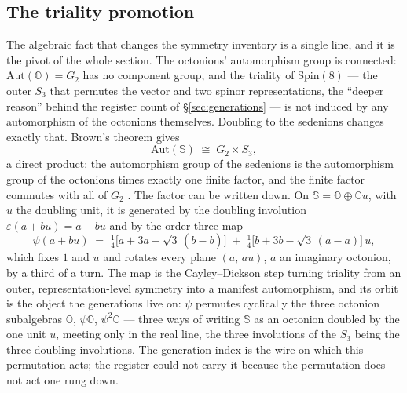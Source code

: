 \subsection{The triality promotion}
\label{sec:sedenions-promotion}

The algebraic fact that changes the symmetry inventory is a single line, and it is the pivot of the
whole section. The octonions' automorphism group is connected: $\mathrm{Aut}(\mathbb{O}) = G_2$ has
no component group, and the triality of $\mathrm{Spin}(8)$ --- the outer $S_3$ that permutes the
vector and two spinor representations, the ``deeper reason'' behind the register count of
\S\ref{sec:generations} --- is not induced by any automorphism of the octonions themselves. Doubling
to the sedenions changes exactly that. Brown's theorem gives
\begin{equation}
  \mathrm{Aut}(\mathbb{S}) \;\cong\; G_2 \times S_3,
  \label{eq:brown}
\end{equation}
a direct product: the automorphism group of the sedenions is the automorphism group of the
octonions times exactly one finite factor, and the finite factor commutes with all of $G_2$
\autocite{brown1967generalized}. The factor can be written down. On
$\mathbb{S} = \mathbb{O}\oplus\mathbb{O}u$, with $u$ the doubling unit, it is generated by the
doubling involution $\varepsilon(a + bu) = a - bu$ and by the order-three map
\begin{equation}
  \psi(a + bu) \;=\; \tfrac14\bigl[a + 3\bar a + \sqrt3\,(b - \bar b)\bigr]
              \;+\; \tfrac14\bigl[b + 3\bar b - \sqrt3\,(a - \bar a)\bigr]\,u ,
  \label{eq:brown-psi}
\end{equation}
which fixes $1$ and $u$ and rotates every plane $(a,\,au)$, $a$ an imaginary octonion, by a third
of a turn. The map is the Cayley--Dickson step turning triality from an outer, representation-level
symmetry into a manifest automorphism, and its orbit is the object the generations live on: $\psi$
permutes cyclically the three octonion subalgebras $\mathbb{O}$, $\psi\mathbb{O}$,
$\psi^{2}\mathbb{O}$ --- three ways of writing $\mathbb{S}$ as an octonion doubled by the one unit
$u$, meeting only in the real line, the three involutions of the $S_3$ being the three doubling
involutions. The generation index is the wire on which this permutation acts; the register could
not carry it because the permutation does not act one rung down.

